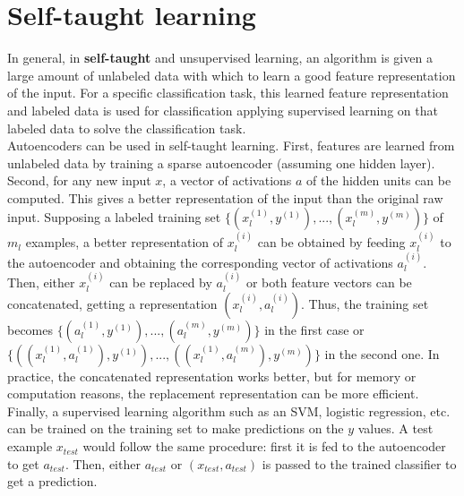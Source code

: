 \documentclass{report}
\begin{document}
\section{Self-taught learning}
In general, in {\bf self-taught} and unsupervised learning, an algorithm is given a large amount of unlabeled data with which to learn a good feature representation of the input.
For a specific classification task, this learned feature representation and labeled data is used for classification applying supervised learning on that labeled data to solve the classification task.
\\
Autoencoders can be used in self-taught learning.
First, features are learned from unlabeled data by training a sparse autoencoder (assuming one hidden layer).
\\
Second, for any new input $x$, a vector of activations $a$ of the hidden units can be computed.
This gives a better representation of the input than the original raw input.
Supposing a labeled training set $\{(x_l^{(1)}, y^{(1)}), ..., (x_l^{(m)}, y^{(m)})\}$ of $m_l$ examples, a better representation of $x_l^{(i)}$ can be obtained by feeding $x_l^{(i)}$ to the autoencoder and obtaining the corresponding vector of activations $a_l^{(i)}$.
Then, either $x_l^{(i)}$ can be replaced by $a_l^{(i)}$ or both feature vectors can be concatenated, getting a representation $(x_l^{(i)}, a_l^{(i)})$.
Thus, the training set becomes $\{(a_l^{(1)}, y^{(1)}), ..., (a_l^{(m)}, y^{(m)})\}$ in the first case or $\{((x_l^{(1)}, a_l^{(1)}), y^{(1)}), ..., ((x_l^{(1)}, a_l^{(m)}), y^{(m)})\}$ in the second one.
In practice, the concatenated representation works better, but for memory or computation reasons, the replacement representation can be more efficient.
\\
Finally, a supervised learning algorithm such as an SVM, logistic regression, etc. can be trained on the training set to make predictions on the $y$ values.
A test example $x_{test}$ would follow the same procedure: first it is fed to the autoencoder to get $a_{test}$.
Then, either $a_{test}$ or $(x_{test}, a_{test})$ is passed to the trained classifier to get a prediction.
\end{document}
